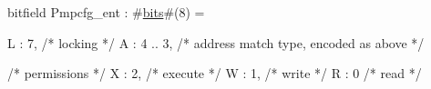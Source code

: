 bitfield Pmpcfg_ent : #\hyperref[sailRISCVzbits]{bits}#(8) = {
  L : 7,        /* locking */
  A : 4 .. 3,   /* address match type, encoded as above */

  /* permissions */
  X : 2,        /* execute */
  W : 1,        /* write */
  R : 0         /* read */
}
